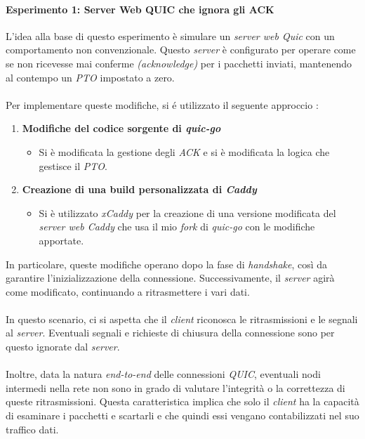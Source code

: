\paragraph{Esperimento 1: Server Web QUIC che ignora gli ACK}
\noindent L'idea alla base di questo esperimento è simulare un \emph{server web Quic} con un comportamento non convenzionale. 
Questo \emph{server} è configurato per operare come se non ricevesse mai conferme \emph{(acknowledge)} per i pacchetti inviati, mantenendo al contempo un \emph{PTO} impostato a zero.
\\\\
Per implementare queste modifiche, si é utilizzato il seguente approccio : 
\begin{enumerate}[label=\roman*]
    \item \textbf{Modifiche del codice sorgente di \emph{quic-go}}
    \begin{itemize}
        \item Si è modificata la gestione degli \emph{ACK} e si è modificata la logica che gestisce il \emph{PTO}.
    \end{itemize}
    \item \textbf{Creazione di una build personalizzata di \emph{Caddy}}
    \begin{itemize}
        \item Si è utilizzato \emph{xCaddy} per la creazione di una versione modificata del \emph{server web Caddy} che usa il mio \emph{fork} di \emph{quic-go} con le modifiche apportate.
    \end{itemize}
\end{enumerate}
In particolare, queste modifiche operano dopo la fase di \emph{handshake}, così da garantire l'inizializzazione della connessione. Successivamente, il \emph{server} agirà come modificato, continuando a ritrasmettere i vari dati.
\\\\
In questo scenario, ci si aspetta che il \emph{client} riconosca le ritrasmissioni e le segnali al \emph{server}. Eventuali segnali e richieste di chiusura della connessione sono per questo ignorate dal \emph{server}.
\\\\
Inoltre, data la natura \emph{end-to-end} delle connessioni \emph{QUIC}, eventuali nodi intermedi nella rete non sono in grado di valutare l'integrità o la correttezza di queste ritrasmissioni. Questa caratteristica implica che solo il \emph{client} ha la capacità di esaminare i pacchetti e scartarli e che quindi essi vengano contabilizzati nel suo traffico dati.
